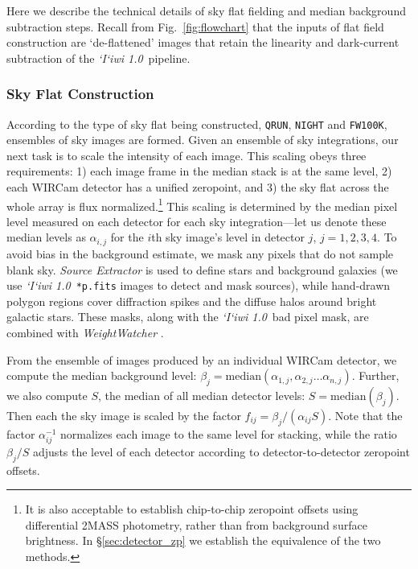 \documentclass[iop]{emulateapj}
\newcommand{\sw}[1]{\textit{#1}} %
\newcommand{\iiwione}{\sw{`I`iwi 1.0}}
\newcommand{\Fig}[1]{Fig.~\ref{fig:#1}}  %
\newcommand{\Sec}[1]{\S\ref{sec:#1}}  %
\begin{document}
Here we describe the technical details of sky flat fielding and median background subtraction steps.
Recall from \Fig{flowchart} that the inputs of flat field construction are `de-flattened' images that retain the linearity and dark-current subtraction of the \iiwione\ pipeline.

\subsubsection{Sky Flat Construction}
\label{sec:skyflatconstruction}

According to the type of sky flat being constructed, \texttt{QRUN}, \texttt{NIGHT} and \texttt{FW100K}, ensembles of sky images are formed.
Given an ensemble of sky integrations, our next task is to scale the intensity of each image.
This scaling obeys three requirements: 1) each image frame in the median stack is at the same level, 2) each WIRCam detector has a unified zeropoint, and 3) the sky flat across the whole array is flux normalized.\footnote{It is also acceptable to establish chip-to-chip zeropoint offsets using differential 2MASS photometry, rather than from background surface brightness. In \Sec{detector_zp} we establish the equivalence of the two methods.}
This scaling is determined by the median pixel level measured on each detector for each sky integration---let us denote these median levels as $\alpha_{i,j}$ for the $i$th sky image's level in detector $j$, $j=1, 2, 3, 4$.
To avoid bias in the background estimate, we mask any pixels that do not sample blank sky.
\sw{Source Extractor} \citep{Bertin:1996} is used to define stars and background galaxies (we use \iiwione\ \texttt{*p.fits} images to detect and mask sources), while hand-drawn polygon regions cover diffraction spikes and the diffuse halos around bright galactic stars. These masks, along with the \iiwione\ bad pixel mask, are combined with \sw{WeightWatcher} \citep{Marmo:2008}.

From the ensemble of images produced by an individual WIRCam detector, we compute the median background level: $\beta_j = \mathrm{median}(\alpha_{1,j}, \alpha_{2,j}\ldots \alpha_{n,j} )$.
Further, we also compute $S$, the median of all median detector levels: $S=\mathrm{median}(\beta_j)$.
Then each the sky image is scaled by the factor $f_{ij} = \beta_j / (\alpha_{ij} S)$.
Note that the factor $\alpha_{ij}^{-1}$ normalizes each image to the same level for stacking, while the ratio $\beta_j / S$ adjusts the level of each detector according to detector-to-detector zeropoint offsets.
\end{document}
